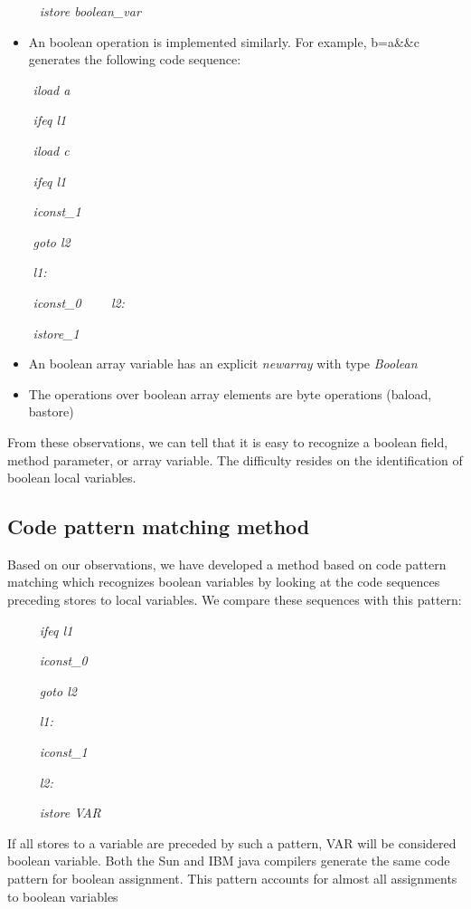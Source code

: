 \emph{~~~~~istore boolean\_var}

\begin{itemize}
\item An boolean operation is implemented similarly. For example,
b=a\&\&c generates the following code sequence:
\end{itemize}
\emph{~~~~iload a }

\emph{~~~~ifeq l1}

\emph{~~~~iload c }

\emph{~~~~ifeq l1 }

\emph{~~~~iconst\_1 }

\emph{~~~~goto l2 }

\emph{~~~~l1:}

\emph{~~~~iconst\_0 }
\emph{~~~~l2:}

\emph{~~~~istore\_1}

\begin{itemize}
\item An boolean array variable has an explicit \emph{newarray} with type \emph{Boolean}
\item The operations over boolean array elements are byte operations (baload,
bastore)
\end{itemize}
From these observations, we can tell that it is easy to recognize a boolean
 field, method parameter, or array variable.
The difficulty resides on the identification of boolean local variables.


\subsection{Code pattern matching method}

Based on our observations, we have developed a method based on code pattern matching
which recognizes boolean variables by looking at the code sequences preceding stores
to local variables. We compare these sequences with this pattern:

\emph{~~~~~ifeq l1}

\emph{~~~~~iconst\_0}

\emph{~~~~~goto l2}

\emph{~~~~~l1:}

\emph{~~~~~iconst\_1}

\emph{~~~~~l2:}

\emph{~~~~~istore VAR}

If all stores to a variable are preceded by such a pattern, VAR will 
be considered boolean variable. Both the Sun and IBM java compilers
generate the same code
pattern for boolean assignment. This pattern accounts for almost all 
assignments to boolean variables

